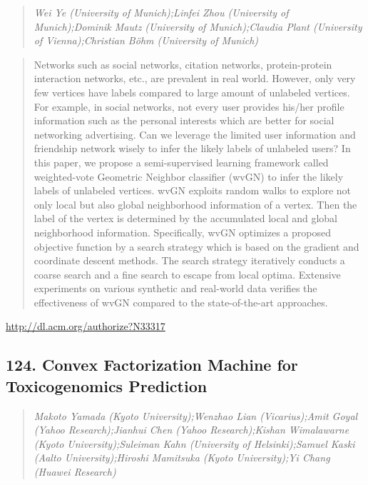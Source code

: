 \documentclass{article}
\begin{document}
\begin{quote}
\footnotesize{\textit{Wei Ye (University of Munich);Linfei Zhou (University of Munich);Dominik Mautz (University of Munich);Claudia Plant (University of Vienna);Christian Böhm (University of Munich)}}

\end{quote}

\begin{quote}
Networks such as social networks, citation networks, protein-protein interaction networks, etc., are prevalent in real world. However, only very few vertices have labels compared to large amount of unlabeled vertices. For example, in social networks, not every user provides his/her profile information such as the personal interests which are better for social networking advertising. Can we leverage the limited user information and friendship network wisely to infer the likely labels of unlabeled users? In this paper, we propose a semi-supervised learning framework called weighted-vote Geometric Neighbor classifier (wvGN) to infer the likely labels of unlabeled vertices. wvGN exploits random walks to explore not only local but also global neighborhood information of a vertex. Then the label of the vertex is determined by the accumulated local and global neighborhood information. Specifically, wvGN optimizes a proposed objective function by a search strategy which is based on the gradient and coordinate descent methods. The search strategy iteratively conducts a coarse search and a fine search to escape from local optima. Extensive experiments on various synthetic and real-world data verifies the effectiveness of wvGN compared to the state-of-the-art approaches.
\end{quote}

\href{http://dl.acm.org/authorize?N33317}{http://dl.acm.org/authorize?N33317}

\subsection{124. Convex Factorization Machine for Toxicogenomics Prediction}

\begin{quote}
\footnotesize{\textit{Makoto Yamada (Kyoto University);Wenzhao Lian (Vicarius);Amit Goyal (Yahoo Research);Jianhui Chen (Yahoo Research);Kishan Wimalawarne (Kyoto University);Suleiman Kahn (University of Helsinki);Samuel Kaski (Aalto University);Hiroshi Mamitsuka (Kyoto University);Yi Chang (Huawei Research)}}

\end{quote}
\end{document}
